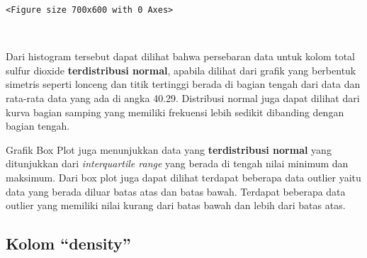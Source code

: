 \documentclass[11pt]{article}
\begin{document}
    
    \begin{Verbatim}[commandchars=\\\{\}]
<Figure size 700x600 with 0 Axes>
    \end{Verbatim}

    
    \begin{center}
    \end{center}
    { \hspace*{\fill} \\}
    
    Dari histogram tersebut dapat dilihat bahwa persebaran data untuk kolom
total sulfur dioxide \textbf{terdistribusi normal}, apabila dilihat dari
grafik yang berbentuk simetris seperti lonceng dan titik tertinggi
berada di bagian tengah dari data dan rata-rata data yang ada di angka
40.29. Distribusi normal juga dapat dilihat dari kurva bagian samping
yang memiliki frekuensi lebih sedikit dibanding dengan bagian tengah.

Grafik Box Plot juga menunjukkan data yang \textbf{terdistribusi normal}
yang ditunjukkan dari \emph{interquartile range} yang berada di tengah
nilai minimum dan maksimum. Dari box plot juga dapat dilihat terdapat
beberapa data outlier yaitu data yang berada diluar batas atas dan batas
bawah. Terdapat beberapa data outlier yang memiliki nilai kurang dari
batas bawah dan lebih dari batas atas.

    \hypertarget{kolom-density}{%
\subsection{Kolom ``density''}\label{kolom-density}}
\end{document}
